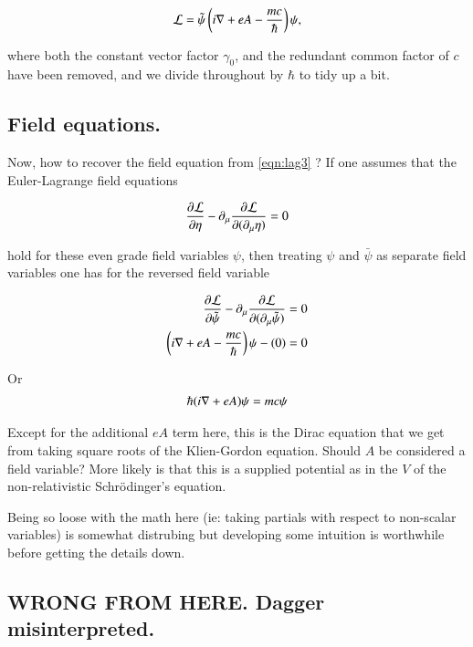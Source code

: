 \documentclass{article}
\begin{document}
\begin{align}\label{eqn:lag3}
\mathcal{L} = \tilde{\psi} \left( i \nabla + e A - \frac{mc}{\hbar} \right) \psi,
\end{align}

where both the constant vector factor $\gamma_0$, and the redundant common factor of $c$ have been removed, and we divide throughout by $\hbar$ to tidy up a bit.

\subsection{ Field equations. }

Now, how to recover the field equation from \ref{eqn:lag3} 
?  If one assumes that the Euler-Lagrange field equations

\begin{align*}
\frac{\partial {\mathcal{L}}}{\partial {\eta}} - \partial_\mu \frac{\partial {\mathcal{L}}}{\partial {(\partial_\mu \eta)}} = 0
\end{align*}

hold for these even grade field variables $\psi$, then treating $\psi$ and $\bar \psi$ as separate field variables one has for the reversed field variable

\begin{align*}
\frac{\partial {\mathcal{L}}}{\partial {\tilde{\psi}}} - \partial_\mu \frac{\partial {\mathcal{L}}}{\partial {(\partial_\mu \tilde{\psi})}} &= 0 \\
\left( i \nabla + e A - \frac{mc}{\hbar}\right) \psi - (0) &= 0
\end{align*}

Or 
\begin{align*}
\hbar (i \nabla + e A) \psi = mc \psi
\end{align*}

Except for the additional $e A$ term here, this is the Dirac equation that we get from taking square roots of the Klien-Gordon equation.  Should $A$ be considered a field variable?  More likely is that this is a supplied potential as in the $V$ of the non-relativistic 
Schr\"{o}dinger's equation.

Being so loose with the math here (ie: taking partials with respect to non-scalar variables) is somewhat distrubing but developing some intuition is worthwhile before getting the details down.

\subsection{ WRONG FROM HERE. Dagger misinterpreted. }
\end{document}
